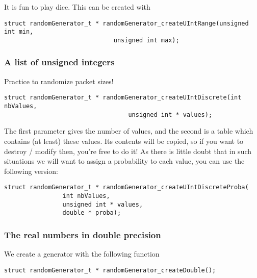    It is fun to play dice. This can be created with

\begin{verbatim}
struct randomGenerator_t * randomGenerator_createUIntRange(unsigned int min,
						      unsigned int max);
\end{verbatim}

%
\subsubsection{A list of unsigned integers}

   Practice to randomize packet sizes!

\begin{verbatim}
struct randomGenerator_t * randomGenerator_createUIntDiscrete(int nbValues,
							      unsigned int * values);
\end{verbatim}

   The first parameter gives the number of values, and the second is 
a table which contains (at least) these values. Its contents will be
copied, so if you want to destroy / modify then, you're free to do it!
   As there is little doubt that in such situations we will
want to assign a probability to each value, you can use the
following version:

\begin{verbatim}
struct randomGenerator_t * randomGenerator_createUIntDiscreteProba(
				int nbValues,
				unsigned int * values,
				double * proba);
\end{verbatim}

%
\subsubsection{The real numbers in double precision}

   We create a generator with the following function

\begin{verbatim}
struct randomGenerator_t * randomGenerator_createDouble();
\end{verbatim}

